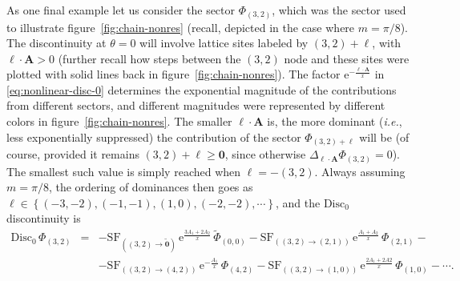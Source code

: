 \documentclass[11pt,a4paper]{article}
\def\disc{{\mathrm{Disc}}}
\begin{document}
As one final example let us consider the sector $\Phi_{(3,2)}$, which was the sector used to illustrate figure~\ref{fig:chain-nonres} (recall, depicted in the case where $m=\pi/8$). The discontinuity at $\theta=0$ will involve lattice sites labeled by $(3,2) + \boldsymbol{\ell}$, with $\boldsymbol{\ell} \cdot \boldsymbol{A} > 0$ (further recall how steps between the $(3,2)$ node and these sites were plotted with solid lines back in figure~\ref{fig:chain-nonres}). The factor $\mathrm{e}^{-\frac{\boldsymbol{\ell} \cdot \boldsymbol{A}}{x}}$ in \eqref{eq:nonlinear-disc-0} determines the exponential magnitude of the contributions from different sectors, and different magnitudes were represented by different colors in figure~\ref{fig:chain-nonres}. The smaller $\boldsymbol{\ell} \cdot \boldsymbol{A}$ is, the more dominant (\textit{i.e.}, less exponentially suppressed) the contribution of the sector $\Phi_{(3,2) + \boldsymbol{\ell}}$ will be (of course, provided it remains $(3,2) + \boldsymbol{\ell} \ge \boldsymbol{0}$, since otherwise $\Delta_{\boldsymbol{\ell} \cdot \boldsymbol{A}} \Phi_{(3,2)} = 0$). The smallest such value is simply reached when $\boldsymbol{\ell} = - (3,2)$. Always assuming $m=\pi/8$, the ordering of dominances then goes as $\boldsymbol{\ell} \in \left\{ (-3,-2), (-1,-1), (1,0), (-2,-2), \cdots \right\}$, and the $\disc_0$ discontinuity is
%
\begin{eqnarray}
\disc_0\,\Phi_{(3,2)} &=& - \mathrm{SF}_{( (3,2)\rightarrow \widetilde{\boldsymbol{0}} )}\, \mathrm{e}^{\frac{3A_1+2A_2}{x}}\, \widetilde{\Phi}_{(0,0)} - \mathrm{SF}_{( (3,2)\rightarrow (2,1) )}\, \mathrm{e}^{\frac{A_1+A_2}{x}}\, \Phi_{(2,1)} - \nonumber \\
&& - \mathrm{SF}_{( (3,2)\rightarrow (4,2) )}\, \mathrm{e}^{-\frac{A_1}{x}}\, \Phi_{(4,2)} - \mathrm{SF}_{( (3,2)\rightarrow (1,0) )}\, \mathrm{e}^{\frac{2A_1+2A2}{x}}\, \Phi_{(1,0)} - \cdots.
\label{eq:disc-32-nonres-0}
\end{eqnarray}
%
\noindent
\end{document}
